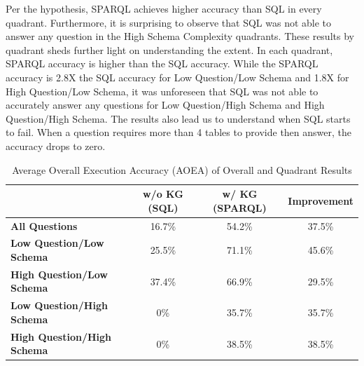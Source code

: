 \documentclass[11pt]{article}
\begin{document}
Per the hypothesis, SPARQL achieves higher accuracy than SQL in every quadrant. 
Furthermore, it is surprising to observe that SQL was not able to answer any question in the High Schema Complexity quadrants. 
These results by quadrant sheds further light on understanding the extent. 
In each quadrant, SPARQL accuracy is higher than the SQL accuracy. 
While the SPARQL accuracy is 2.8X the SQL accuracy for Low Question/Low Schema and 1.8X for High Question/Low Schema, it was unforeseen that SQL was not able to accurately answer any questions for Low Question/High Schema and High Question/High Schema. 
The results also lead us to understand when SQL starts to fail.
When a question requires more than 4 tables to provide then answer, the accuracy drops to zero. 

\renewcommand{\arraystretch}{1.2}
\begin{table}[h!]
\centering
\begin{tabular}{|l|c|c|c|}
\hline
\ & \textbf{w/o KG (SQL)} & \textbf{w/ KG (SPARQL)} & \textbf{Improvement}\\
\hline
\textbf{All Questions} & 16.7\% & 54.2\% & 37.5\%\\
\hline
\textbf{Low Question/Low Schema} & 25.5\% & 71.1\% & 45.6\%\\
\hline
\textbf{High Question/Low Schema} & 37.4\% & 66.9\% & 29.5\%\\ 
\hline
\textbf{Low Question/High Schema} & 0\% & 35.7\% & 35.7\%\\
\hline
\textbf{High Question/High Schema} & 0\% & 38.5\% & 38.5\%\\
\hline
\end{tabular}
\caption{Average Overall Execution Accuracy (AOEA) of Overall and Quadrant Results}
\label{table:Results}
\end{table}
\end{document}
